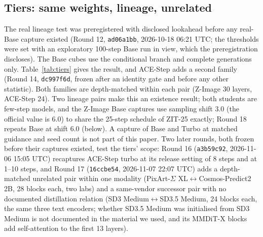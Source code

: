 \documentclass[11pt]{article}
\newcommand{\TT}{ZIT-25}%
\begin{document}
\subsection{Tiers: same weights, lineage, unrelated}
The real lineage test was preregistered with disclosed lookahead before any real-Base capture existed (Round 12, \texttt{ad06a1bb}, 2026-10-18 06:21 UTC; the thresholds were set with an exploratory 100-step Base run in view, which the preregistration discloses). The Base cubes use the conditional branch and complete generations only. Table~\ref{tab:tiers} gives the result, and ACE-Step adds a second family (Round 14, \texttt{dc997f6d}, frozen after an identity gate and before any other statistic). Both families are depth-matched within each pair (Z-Image 30 layers, ACE-Step 24). Two lineage pairs make this an existence result; both students are few-step models, and the Z-Image Base captures use sampling shift $3.0$ (the official value is $6.0$) to share the 25-step schedule of \TT{} exactly; Round 18 repeats Base at shift $6.0$ (below). A capture of Base and Turbo at matched guidance and seed count is not part of this paper. Two later rounds, both frozen before their captures existed, test the tiers' scope: Round 16 (\texttt{a3b59c92}, 2026-11-06 15:05 UTC) recaptures ACE-Step turbo at its release setting of 8 steps and at 1--10 steps, and Round 17 (\texttt{16ccbe54}, 2026-11-07 22:07 UTC) adds a depth-matched unrelated pair within one modality (PixArt-$\Sigma$ XL$\leftrightarrow$Cosmos-Predict2 2B, 28 blocks each, two labs) and a same-vendor successor pair with no documented distillation relation (SD3 Medium$\leftrightarrow$SD3.5 Medium, 24 blocks each, the same three text encoders; whether SD3.5 Medium was initialised from SD3 Medium is not documented in the material we used, and its MMDiT-X blocks add self-attention to the first 13 layers).
\end{document}

